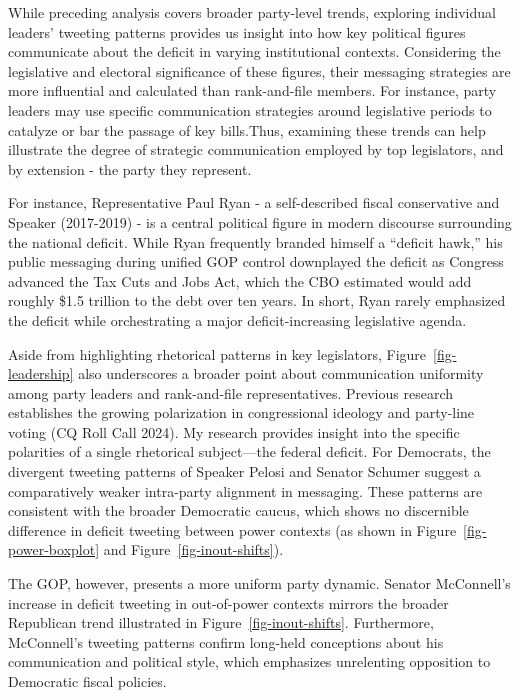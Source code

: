 \documentclass[
]{article}
\begin{document}
While preceding analysis covers broader party-level trends, exploring
individual leaders' tweeting patterns provides us insight into how key
political figures communicate about the deficit in varying institutional
contexts. Considering the legislative and electoral significance of
these figures, their messaging strategies are more influential and
calculated than rank-and-file members. For instance, party leaders may
use specific communication strategies around legislative periods to
catalyze or bar the passage of key bills.Thus, examining these trends
can help illustrate the degree of strategic communication employed by
top legislators, and by extension - the party they represent.

For instance, Representative Paul Ryan - a self-described fiscal
conservative and Speaker (2017-2019) - is a central political figure in
modern discourse surrounding the national deficit. While Ryan frequently
branded himself a ``deficit hawk,'' his public messaging during unified
GOP control downplayed the deficit as Congress advanced the Tax Cuts and
Jobs Act, which the CBO estimated would add roughly \$1.5 trillion to
the debt over ten years. In short, Ryan rarely emphasized the deficit
while orchestrating a major deficit-increasing legislative agenda.

Aside from highlighting rhetorical patterns in key legislators,
Figure~\ref{fig-leadership} also underscores a broader point about
communication uniformity among party leaders and rank-and-file
representatives. Previous research establishes the growing polarization
in congressional ideology and party-line voting (CQ Roll Call 2024). My
research provides insight into the specific polarities of a single
rhetorical subject---the federal deficit. For Democrats, the divergent
tweeting patterns of Speaker Pelosi and Senator Schumer suggest a
comparatively weaker intra-party alignment in messaging. These patterns
are consistent with the broader Democratic caucus, which shows no
discernible difference in deficit tweeting between power contexts (as
shown in Figure~\ref{fig-power-boxplot} and
Figure~\ref{fig-inout-shifts}).

The GOP, however, presents a more uniform party dynamic. Senator
McConnell's increase in deficit tweeting in out-of-power contexts
mirrors the broader Republican trend illustrated in
Figure~\ref{fig-inout-shifts}. Furthermore, McConnell's tweeting
patterns confirm long-held conceptions about his communication and
political style, which emphasizes unrelenting opposition to Democratic
fiscal policies.
\end{document}
